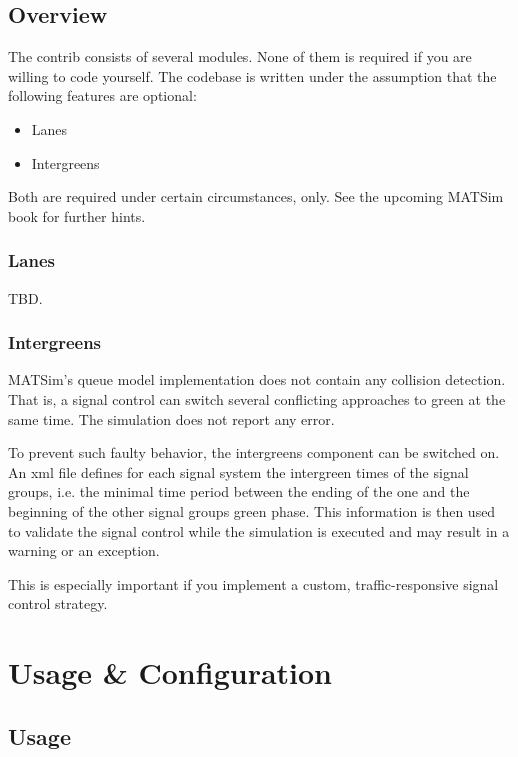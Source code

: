 \subsection{Overview}

The contrib consists of several modules. None of them is required if you are willing to code yourself. 
The codebase is written under the assumption that the following features are optional:   

\begin{itemize}
	\item Lanes
	\item Intergreens
\end{itemize}

Both are required under certain circumstances, only. 
See the upcoming MATSim book for further hints. 

\subsubsection{Lanes}

TBD.

\subsubsection{Intergreens}

MATSim's queue model implementation does not contain any collision detection. 
That is, a signal control can switch several conflicting approaches to green at the same time. 
The simulation does not report any error. 

To prevent such faulty behavior, the intergreens component can be switched on. 
An xml file defines for each signal system the intergreen times of the signal groups, i.e. the minimal time period between the ending of the one and the beginning of the other signal groups green phase. 
This information is then used to validate the signal control while the simulation is executed and may result in a warning or an exception. 

This is especially important if you implement a custom, traffic-responsive signal control strategy.  


\section{Usage \& Configuration}
\label{sec:signals_configuration}

\subsection{Usage}

